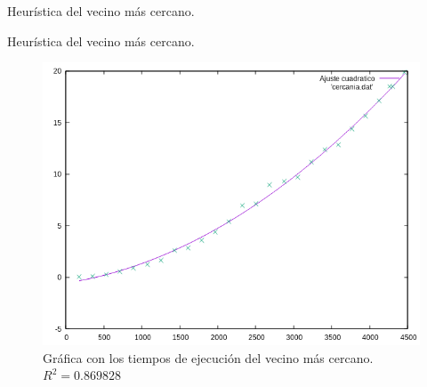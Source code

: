 \documentclass[10pt, xcolor=table]{beamer}
\begin{document}
\begin{frame}[fragile]{Heurística del vecino más cercano. }
\begin{table}[h!]
 	\centering
 	\footnotesize
 	\caption{Experiencia empírica de el vecino más cercano}
 \end{table}
\end{frame}

\begin{frame}[fragile]{Heurística del vecino más cercano. }
 \begin{figure}[h!]
 	\centering
 	\includegraphics[scale=0.5]{./Images/cercania.png}
 	\caption{Gráfica con los tiempos de ejecución del vecino más cercano. \(R^2 = 0.869828\)}
 \end{figure}
\end{frame}
\end{document}
